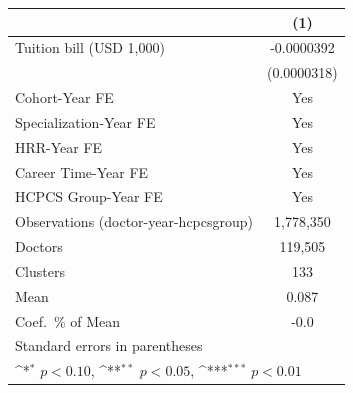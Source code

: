{
\def\sym#1{\ifmmode^{#1}\else\(^{#1}\)\fi}
\begin{tabular}{l*{1}{c}}
\hline\hline
                    &\multicolumn{1}{c}{(1)}         \\
\hline
Tuition bill (USD 1,000)&  -0.0000392         \\
                    & (0.0000318)         \\
[1em]
Cohort-Year FE      &         Yes         \\
[1em]
Specialization-Year FE&         Yes         \\
[1em]
HRR-Year FE         &         Yes         \\
[1em]
Career Time-Year FE &         Yes         \\
[1em]
HCPCS Group-Year FE &         Yes         \\
\hline
Observations (doctor-year-hcpcsgroup)&   1,778,350         \\
Doctors             &     119,505         \\
Clusters            &         133         \\
Mean                &       0.087         \\
Coef.\ \% of Mean   &        -0.0         \\
\hline\hline
\multicolumn{2}{l}{\footnotesize Standard errors in parentheses}\\
\multicolumn{2}{l}{\footnotesize \sym{*} \(p<0.10\), \sym{**} \(p<0.05\), \sym{***} \(p<0.01\)}\\
\end{tabular}
}
